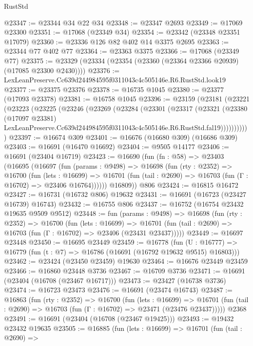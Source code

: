 \begin{lexlean}{RustStd}
\begin{coremodule}
@23347 := @23344 @34 @22 @34
@23348 := @23347 @2693
@23349 := @17069 @23300
@23351 := @17068 (@23349 @34)
@23354 := @23342 (@23348 @23351 @17079)
@23360 := @23336 @126 @82 @402 @14 @3375 @2695
@23363 := @23344 @77 @402 @77
@23364 := @23363 @3375
@23366 := @17068 (@23349 @77)
@23375 := @23329 (@23334 (@23354 (@23360 (@23364 @23366 @20939) (@17085 @23300 @2430))))
@23376 := LexLeanPreserve.Cc639d244984595f0311043c4c505146e.R6.RustStd.look19
@23377 := @23375 @23376
@23378 := @16735 @1045
@23380 := @23377 (@17093 @23378)
@23381 := @16758 @1045
@23396 := @23159
    (@23181
      (@23221
        (@23223
          (@23225
            (@23246
              (@23269
                (@23284
                  (@23301
                    (@23317
                      (@23321
                        (@23380
                          (@17097 @23381)
                          LexLeanPreserve.Cc639d244984595f0311043c4c505146e.R6.RustStd.fal19)))))))))))
@23397 := @16674 @309
@23401 := @16676 (@16680 @309) (@16686 @309)
@23403 := @16691 (@16470 @16692)
@23404 := @9505 @14177
@23406 := @16691 (@23404 @16719)
@23423 := @16690
    (fun (fn : @58) =>
    @23403
      (@16695
        (@16697
          (fun (params : @9498) =>
          @16698
            (fun (rty : @2352) =>
            @16700
              (fun (lets : @16699) =>
              @16701 (fun (tail : @2690) => @16703 (fun (Γ : @16702) => @23406 @16764))))))
        @16809))
    @806
@23424 := @16815 @16472
@23427 := @16731 (@16732 @806) @19632
@23431 := @16691 (@16723 (@23427 @16739) @16743)
@23432 := @16755 @806
@23437 := @16752 (@16754 @23432 @19635 @9509 @9512)
@23448 := fun (params : @9498) =>
  @16698
    (fun (rty : @2352) =>
    @16700
      (fun (lets : @16699) =>
      @16701 (fun (tail : @2690) => @16703 (fun (Γ : @16702) => @23406 (@23431 @23437)))))
@23449 := @16697 @23448
@23450 := @16695 @23449
@23459 := @16778
    (fun (U : @16777) => @16779 (fun (t : @7) => @16786 (@16691 (@16792 @19632 @9515) @16803)))
@23462 := @23424 (@23450 @23459) @19630
@23464 := @16676 @23449 @23459
@23466 := @16860 @23448 @3736
@23467 := @16709 @3736
@23471 := @16691 (@23404 (@16708 (@23467 @16717)))
@23473 := @23427 (@16738 @3736)
@23474 := @16723 @23473
@23476 := @16691 (@23474 @16743)
@23487 := @16863
    (fun (rty : @2352) =>
    @16700
      (fun (lets : @16699) =>
      @16701 (fun (tail : @2690) => @16703 (fun (Γ : @16702) => @23471 (@23476 @23437)))))
    @2368
@23491 := @16691 (@23404 (@16708 (@23467 @19425)))
@23493 := @19432 @23432 @19635
@23505 := @16885
    (fun (lets : @16699) =>
    @16701
      (fun (tail : @2690) =>

\end{coremodule}
\end{lexlean}
